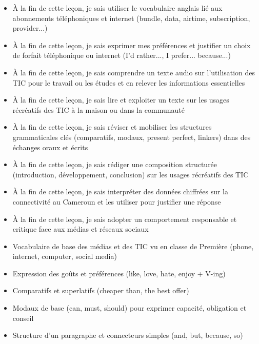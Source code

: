 \documentclass[11pt]{article}
\begin{document}
\begin{objectifs}
\begin{itemize}
\item À la fin de cette leçon, je sais utiliser le vocabulaire anglais lié aux abonnements téléphoniques et internet (bundle, data, airtime, subscription, provider...)
\item À la fin de cette leçon, je sais exprimer mes préférences et justifier un choix de forfait téléphonique ou internet (I'd rather..., I prefer... because...)
\item À la fin de cette leçon, je sais comprendre un texte audio sur l'utilisation des TIC pour le travail ou les études et en relever les informations essentielles
\item À la fin de cette leçon, je sais lire et exploiter un texte sur les usages récréatifs des TIC à la maison ou dans la communauté
\item À la fin de cette leçon, je sais réviser et mobiliser les structures grammaticales clés (comparatifs, modaux, present perfect, linkers) dans des échanges oraux et écrits
\item À la fin de cette leçon, je sais rédiger une composition structurée (introduction, développement, conclusion) sur les usages récréatifs des TIC
\item À la fin de cette leçon, je sais interpréter des données chiffrées sur la connectivité au Cameroun et les utiliser pour justifier une réponse
\item À la fin de cette leçon, je sais adopter un comportement responsable et critique face aux médias et réseaux sociaux
\end{itemize}
\end{objectifs}

\begin{prerequis}
\begin{itemize}
\item Vocabulaire de base des médias et des TIC vu en classe de Première (phone, internet, computer, social media)
\item Expression des goûts et préférences (like, love, hate, enjoy + V-ing)
\item Comparatifs et superlatifs (cheaper than, the best offer)
\item Modaux de base (can, must, should) pour exprimer capacité, obligation et conseil
\item Structure d'un paragraphe et connecteurs simples (and, but, because, so)
\end{itemize}
\end{prerequis}
\end{document}
